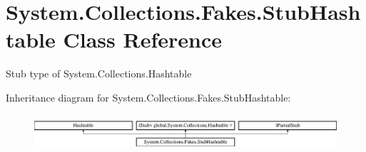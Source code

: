 \hypertarget{class_system_1_1_collections_1_1_fakes_1_1_stub_hashtable}{\section{System.\-Collections.\-Fakes.\-Stub\-Hashtable Class Reference}
\label{class_system_1_1_collections_1_1_fakes_1_1_stub_hashtable}
}


Stub type of System.\-Collections.\-Hashtable 


Inheritance diagram for System.\-Collections.\-Fakes.\-Stub\-Hashtable\-:\begin{figure}[H]
\begin{center}
\leavevmode
\includegraphics[height=1.352657cm]{class_system_1_1_collections_1_1_fakes_1_1_stub_hashtable}
\end{center}
\end{figure}
